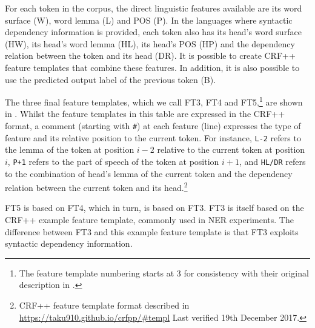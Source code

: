 \documentclass[output=paper
,modfonts
,nonflat]{langsci/langscibook}
\begin{document}
For each token in the corpus, the direct linguistic features available 
are its word surface (W), word lemma (L) and POS (P). In the languages
where syntactic dependency information is provided, each token also
has its head's word surface (HW), its head's word lemma (HL), its
head's POS (HP) and the dependency relation between the token and its
head (DR). It is possible to create CRF++ feature templates that
combine these features. In addition, it is also possible to use the
predicted output label of the previous token (B). 

The three final feature templates, which we call FT3, FT4 and FT5,\footnote{The feature template numbering starts at 3 for consistency with their original description in \cite{maldonado2017}.} are shown in . Whilst the feature templates in this table are expressed in the CRF++ format, a comment (starting with \texttt{\#}) at each feature (line) expresses the type of feature and its relative position to the current token. For instance, \texttt{L-2} refers to the lemma of the token at position $i-2$ relative to the current token at position~$i$, \texttt{P+1} refers to the part of speech of the token at position $i+1$, and \texttt{HL/DR} refers to the combination of head's lemma of the current token and the dependency relation between the current token and its head.\footnote{CRF++ feature template format described in \url{https://taku910.github.io/crfpp/\#templ} Last verified 19th December 2017.}

FT5 is based on FT4, which in turn, is based on FT3. FT3 is itself based on the CRF++ example feature template, commonly used in NER experiments. The difference between FT3 and this example feature template is that FT3 exploits syntactic dependency information. 
\end{document}

